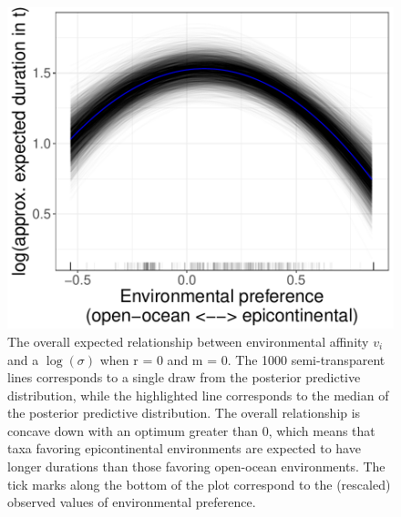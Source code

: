 \documentclass[11pt]{article}
\begin{document}
\begin{figure}[ht]
  \centering
  \includegraphics[height = 0.5\textheight,width=\textwidth,keepaspectratio=true]{figure/env_effect_med_cweib_base}
  \caption{The overall expected relationship between environmental affinity \(v_{i}\) and a \(\log(\sigma)\) when r = 0 and m = 0. The 1000 semi-transparent lines corresponds to a single draw from the posterior predictive distribution, while the highlighted line corresponds to the median of the posterior predictive distribution. The overall relationship is concave down with an optimum greater than 0, which means that taxa favoring epicontinental environments are expected to have longer durations than those favoring open-ocean environments. The tick marks along the bottom of the plot correspond to the (rescaled) observed values of environmental preference.}
  \label{fig:env_mean}
\end{figure}
\end{document}
